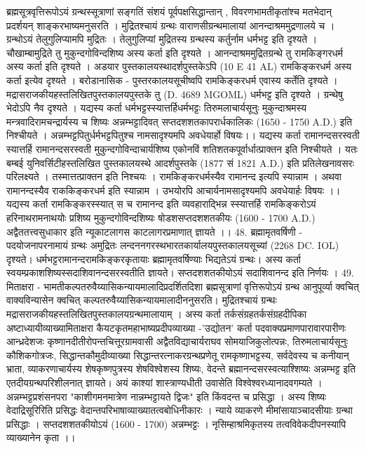 ब्रह्मसूत्रवृत्तिरूपोऽयं ग्रन्थस्सूत्राणां सङ्गतिं संशयं पूर्वपक्षसिद्धान्तान् , विवरणभामतीकृतांश्च मतभेदान् प्रदर्शयन् शाङ्करभाष्यमनुसरति । मुद्रितश्चायं ग्रन्थः वाराणसीग्रन्थमालायां आनन्दाश्रममुद्रणालये च । ग्रन्थोऽयं तेलुगुलिप्यामपि मुद्रितः । तेलुगुलिप्यां मुद्रितस्य ग्रन्थस्य कर्तुर्नाम धर्मभट्ट इति दृश्यते । चौखाम्बामुद्रिते तु मुकुन्दगोविन्दशिष्य अस्य कर्ता इति दृश्यते । आनन्दाश्रममुद्रितग्रन्थे तु रामकिङ्गरधर्म अस्य कर्ता इति दृश्यते । अडयार पुस्तकालयस्थादर्शपुस्तकेऽपि (10 E 41  AL) रामकिङ्करधर्म अस्य कर्ता इत्येव दृश्यते । बरोडानासिक - पुस्तरकालयसूचीष्वपि रामकिङ्करधर्म एवास्य कर्तेति दृश्यते । मद्रासराजकीयहस्तलिखितपुस्तकालयपुस्तके तु (D. 4689 MGOML) धर्मभट्ट इति दृश्यते । ग्रन्थेषु भेदोऽपि नैव दृश्यते । यद्यस्य कर्ता धर्मभट्टस्स्यात्तर्हिधर्मभट्टः तिरुमलाचार्यसूनुः मुकुन्दाश्रमस्य मन्त्रवादिरामचन्द्रार्यस्य च शिष्यः अन्नम्भट्टादिवत् सप्तदशशतकापरार्धकालिकः (1650 - 1750 A.D.) इति निश्चीयते । अन्नम्भट्टपितुर्धर्मभट्टपितुश्च नामसादृश्यमपि अवधेयार्हो विषयः।। यद्यस्य कर्ता रामानन्दसरस्वती स्यात्तर्हि रामानन्दसरस्वती मुकुन्दगोविन्दाचार्यशिष्य एकोनविं शतिशतकपूर्वार्धात्प्राक्तन इति निश्चीयते । यतः बम्बई युनिवर्सिटीहस्तलिखित पुस्तकालयस्थे आदर्शपुस्तके (1877 सं 1821 A.D.) इति प्रतिलेखनावसरः परिलक्ष्यते । तस्मात्तत्प्राक्तन इति निश्चयः । रामकिङ्करधर्मस्यैव रामानन्द इत्यपि स्यान्नाम । अथवा रामानन्दस्यैव राककिङ्करधर्म इति स्यान्नाम । उभयोरपि आचार्यनामसादृश्यमपि अवधेयार्हः विषयः ।। यद्यस्य कर्ता रामकिङ्करस्स्यात् स च रामानन्द इति व्यवहाराद्भिन्न स्स्यात्तर्हि रामकिङ्करोऽयं हरिनाथरामनाथयोः प्रशिष्य मुकुन्दगोविन्दशिष्यः षोडशसप्तदशशतकीयः (1600 - 1700 A.D.) अद्वैततत्त्वसुधाकार इति न्यूकाटलागस काटलागरप्रमाणात् ज्ञायते ।। 
48. ब्रह्मामृतवर्षिणी -
पदयोजनापरनामायं ग्रन्थः अमुद्रितः लन्दननगरस्थभारतकार्यालयपुस्तकालयसूच्यां (2268 DC. IOL) दृश्यते। धर्मभट्टरामानन्दरामकिङ्करकृतायाः ब्रह्मामृतवर्षिण्याः भिद्यतेऽयं ग्रन्थः। अस्य कर्ता स्वयम्प्रकाशशिष्यस्सदाशिवानन्दसरस्वतीति ज्ञायते। सप्तदशशतकीयोऽयं सदाशिवानन्द इति निर्णयः । 
49. मिताक्षरा - 
भामतीकल्पतरुवैय्यासिकन्यायमालादिप्रदर्शितदिशा ब्रह्मसूत्राणां वृत्तिरूपोऽयं ग्रन्थ आनुपूर्व्या क्वचित् वाक्यविन्यासेन क्वचित् कल्पतरुवैय्यासिकन्यायमालादीननुसरति। मुद्रितश्चायं ग्रन्थः मद्रासराजकीयहस्तलिखितपुस्तकालयग्रन्थमालायाम् । अस्य कर्ता तर्कसंग्रहतर्कसंग्रहदीपिका अष्टाध्यायीव्याख्यामिताक्षरा कैयटकृतमहाभाष्यप्रदीपव्याख्या -'उद्योतन' कर्ता पदवाक्यप्रमाणपारावारपारीणः आन्ध्रदेशजः कृष्णानदीतीरोपन्तचित्तूरग्रामवासी अद्वैतविद्याचार्यराघव सोमयाजिकुलोत्पन्नः, तिरुमलाचार्यसूनुः कौशिकगोत्रजः, सिद्धान्तकौमुदीव्याख्या सिद्धान्तरत्नाकरग्रन्थप्रणेतू रामकृष्णाभट्टस्य, सर्वदेवस्य च कनीयान् भ्राता, व्याकरणाचार्यस्य शेषकृष्णपुत्रस्य शेषविश्वेशस्य शिष्यः, वेदन्ते ब्रह्मानन्दसरस्वत्याश्शिष्यः अन्नम्भट्ट इति एतदीयग्रन्थपरिशीलनात् ज्ञायते। अयं काश्यां शास्त्राण्यधीती उवासेति विश्वेश्वरध्यानादवगम्यते । अन्नम्भट्टप्रशंसनपरा "काशीगमनमात्रेण नान्नम्भट्टायते द्विजः" इति किंवदन्त च प्रसिद्धा । अस्य शिष्यः वेदाद्रिसूरिरिति प्रसिद्धः वेदान्तपरिभाषाव्याख्यातत्वबोधिनीकारः । न्याये व्याकरणे मीमांसायाञ्चादसीयाः ग्रन्था प्रसिद्धाः । सप्तदशशतकीयोऽयं (1600 - 1700) अन्नम्भट्टः । नृसिम्हाश्रमिकृतस्य तत्वविवेकदीपनस्यापि व्याख्यानेन कृता ।। 
